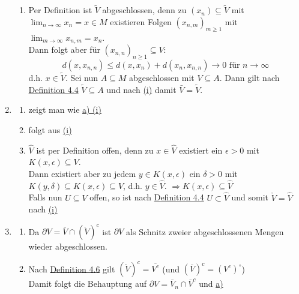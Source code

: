 \begin{prop}
\begin{beweis}
\begin{enumerate}[label=\alph*\upshape)]
\begin{enumerate}
					\item Per Definition ist $\tilde V$ abgeschlossen, denn zu $(x_{n}) \subseteq \tilde V$ mit $\lim_{n \rightarrow \infty} x_{n} = x \in M$ existieren Folgen $(x_{n, m})_{m \geq 1}$ mit  $\lim_{m \rightarrow \infty} x_{n, m} = x_{n}$. \\
						Dann folgt aber für $(x_{n, n})_{n \geq 1} \subseteq V$:
						\[ d(x, x_{n, n}) \leq d(x, x_{n}) + d(x_{n}, x_{n, n}) \rightarrow 0 \text{ für } n \rightarrow \infty \]
						d.h. $x \in \tilde V$. Sei nun $A \subseteq M$ abgeschlossen mit $V \subseteq A$. Dann gilt nach \hyperref[def:1-4.4-abgoff]{Definition 4.4} $\tilde V \subseteq A$ und nach \hyperref[prop:1-4.8.a1]{(i)} damit $\bar V = \tilde V$.
				\end{enumerate} 
			\item 
				\begin{enumerate}
					\item zeigt man wie \hyperref[prop:1-4.8.a1-proof]{a) (i)}
					\item folgt aus \hyperref[prop:1-4.8.b1]{(i)}
					\item $\hat V$ ist per Definition offen, denn zu $x \in \hat V$ existiert ein $\epsilon > 0$ mit  $K(x, \epsilon) \subseteq V$. \\
						 Dann existiert aber zu jedem $y \in K(x, \epsilon)$ ein $\delta > 0$ mit $K(y, \delta) \subseteq K(x, \epsilon) \subseteq V$, d.h. $y \in \hat V$. $\Rightarrow K(x, \epsilon) \subseteq \hat V$ \\
						 Falls nun $U \subseteq V$ offen, so ist nach \hyperref[def:1-4.4-abgoff]{Definition 4.4} $U \subset \hat V$ und somit $\mathring V = \hat V$ nach \hyperref[prop:1-4.8.b1]{(i)}
				\end{enumerate} 
			\item
				\begin{enumerate}
					\item Da $\partial V = \overline{V} \cap (\mathring{V})^{c}$ ist $\partial V$ als Schnitz zweier abgeschlossenen Mengen wieder abgeschlossen.
					\item Nach \hyperref[def:1-4.7-abschinnrand]{Definition 4.6} gilt $(\mathring{V})^{c} = \overline{V^{c}}$ \quad (und $\left( \bar V \right)^{c} = \left( V^{c} \right)^{\circ}$) \\
						Damit folgt die Behauptung auf $\partial V = \bar V_{n} \cap \bar V^{c}$ und \hyperref[prop:1-4.8.a1]{a)}
				\end{enumerate} 
		\end{enumerate}	
	\end{beweis}
\end{prop}

